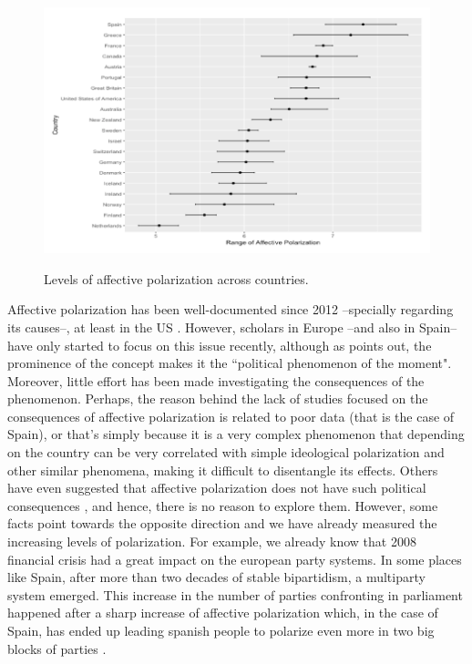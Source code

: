 \documentclass[a4paper, svgnames]{article}
\begin{document}
\begin{figure}[H]
	\centering
	\caption{Levels of affective polarization across countries.}
	\includegraphics[scale=.7]{figure1.png}
	\label{fig:af-pol-comp}
\end{figure}

Affective polarization has been well-documented since 2012 --specially regarding its causes--, at least in the US \citep{Hetherington2015,Rogowski2016a, Webster2017,Lelkes2018,Iyengar2019, Klein2020}. However, scholars in Europe --and also in Spain-- have only started to focus on this issue recently, although as \cite{Miller2019} points out, the prominence of the concept makes it the ``political phenomenon of the moment". Moreover, little effort has been made investigating the consequences of the phenomenon. Perhaps, the reason behind the lack of studies focused on the consequences of affective polarization is related to poor data (that is the case of Spain), or that's simply because it is a very complex phenomenon that depending on the country can be very correlated with simple ideological polarization and other similar phenomena, making it difficult to disentangle its effects. Others have even suggested that affective polarization does not have such political consequences \citep*{broockmanDoesAffectivePolarization2020}, and hence, there is no reason to explore them. However, some facts point towards the opposite direction and we have already measured the increasing levels of polarization. For example, we already know that 2008 financial crisis had a great impact on the european party systems. In some places like Spain, after more than two decades of stable bipartidism, a multiparty system emerged. This increase in the number of parties confronting in parliament happened after a sharp increase of affective polarization which, in the case of Spain, has ended up leading spanish people to polarize even more in two big blocks of parties \citep{Orriols2020}.
\end{document}
